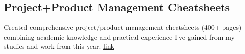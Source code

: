 \documentclass[a4paper, 12pt]{article}
\begin{document}
\subsection {{Project+Product Management Cheatsheets}}
\begin{zitemize}
\item Created comprehensive project/product management cheatsheets (400+ pages) combining academic knowledge and practical experience I've gained from my studies and work from this year.
\href{http://slavikss.github.io/blog/}{link}
\end{zitemize}
\end{document}
